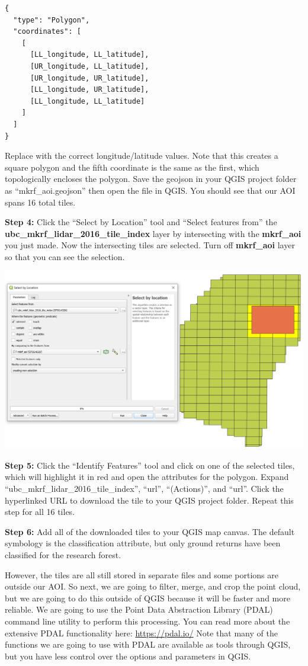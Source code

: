 \documentclass[
]{book}
\begin{document}
\begin{verbatim}
{
  "type": "Polygon",
  "coordinates": [
    [
      [LL_longitude, LL_latitude],
      [UR_longitude, LL_latitude],
      [UR_longitude, UR_latitude],
      [LL_longitude, UR_latitude],
      [LL_longitude, LL_latitude]
    ]
  ]
}
\end{verbatim}

Replace with the correct longitude/latitude values. Note that this creates a square polygon and the fifth coordinate is the same as the first, which topologically encloses the polygon. Save the geojson in your QGIS project folder as ``mkrf\_aoi.geojson'' then open the file in QGIS. You should see that our AOI spans 16 total tiles.

\textbf{Step 4:} Click the ``Select by Location'' tool and ``Select features from'' the \textbf{ubc\_mkrf\_lidar\_2016\_tile\_index} layer by intersecting with the \textbf{mkrf\_aoi} you just made. Now the intersecting tiles are selected. Turn off \textbf{mkrf\_aoi} layer so that you can see the selection.

\includegraphics[width=0.75\linewidth]{images/01-qgis-intersect-aoi-tiles}

\textbf{Step 5:} Click the ``Identify Features'' tool and click on one of the selected tiles, which will highlight it in red and open the attributes for the polygon. Expand ``ubc\_mkrf\_lidar\_2016\_tile\_index'', ``url'', ``(Actions)'', and ``url''. Click the hyperlinked URL to download the tile to your QGIS project folder. Repeat this step for all 16 tiles.

\textbf{Step 6:} Add all of the downloaded tiles to your QGIS map canvas. The default symbology is the classification attribute, but only ground returns have been classified for the research forest.

However, the tiles are all still stored in separate files and some portions are outside our AOI. So next, we are going to filter, merge, and crop the point cloud, but we are going to do this outside of QGIS because it will be faster and more reliable. We are going to use the Point Data Abstraction Library (PDAL) command line utility to perform this processing. You can read more about the extensive PDAL functionality here: \url{https://pdal.io/} Note that many of the functions we are going to use with PDAL are available as tools through QGIS, but you have less control over the options and parameters in QGIS.
\end{document}
